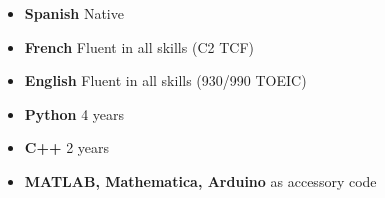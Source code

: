 %
%
%

\begin{multicols}{2}
\begin{itemize}
    \item \textbf{Spanish} Native
    \item \textbf{French} Fluent in all skills (C2 TCF)
    \item \textbf{English} Fluent in all skills (930/990 TOEIC)
\end{itemize}

\columnbreak

\begin{itemize}
    \item \textbf{Python} 4 years
    \item \textbf{C++} 2 years
    \item \textbf{MATLAB, Mathematica, Arduino} as accessory code
\end{itemize}
\end{multicols}
\vspace{-1.5em}
